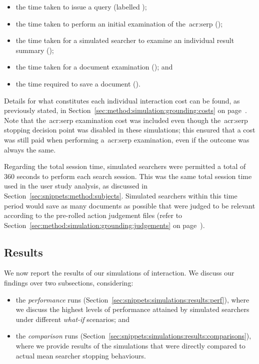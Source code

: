 \vspace*{-4mm}
\begin{itemize}
    \item{the time taken to issue a query (labelled );}
    \item{the time taken to perform an initial examination of the~\gls{acr:serp} ();}
    \item{the time taken for a simulated searcher to examine an individual result summary ();}
    \item{the time taken for a document examination (); and}
    \item{the time required to save a document ().}
\end{itemize}

Details for what constitutes each individual interaction cost can be found, as previously stated, in Section~\ref{sec:method:simulation:grounding:costs} on page~\pageref{sec:method:simulation:grounding:costs}. Note that the~\gls{acr:serp} examination cost was included even though the~\gls{acr:serp} stopping decision point was disabled in these simulations; this ensured that a cost was still paid when performing a~\gls{acr:serp} examination, even if the outcome was always the same.

Regarding the total session time, simulated searchers were permitted a total of $360$ seconds to perform each search session. This was the same total session time used in the user study analysis, as discussed in Section~\ref{sec:snippets:method:subjects}. Simulated searchers within this time period would save as many documents as possible that were judged to be relevant according to the pre-rolled action judgement files (refer to Section~\ref{sec:method:simulation:grounding:judgements} on page~\pageref{sec:method:simulation:grounding:judgements}).

\subsection{Results}\label{sec:snippets:simulations:results}
We now report the results of our simulations of interaction. We discuss our findings over two subsections, considering:

\begin{itemize}
    \item{the \emph{performance} runs (Section~\ref{sec:snippets:simulations:results:perf}), where we discuss the highest levels of performance attained by simulated searchers under different \emph{what-if} scenarios; and}
    \item{the \emph{comparison} runs (Section~\ref{sec:snippets:simulations:results:comparisons}), where we provide results of the simulations that were directly compared to actual mean searcher stopping behaviours.}
\end{itemize}
\vspace*{-4mm}

